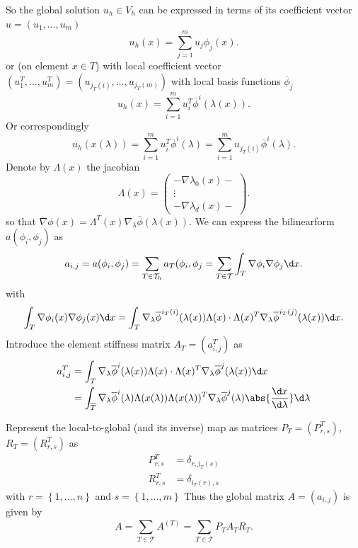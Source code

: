 So the global solution $u_{h}\in V_{h}$ can be expressed in terms of its coefficient vector $u = (u_1, \ldots , u_{m})$
\[
	u_{h}(x)=\sum_{j=1}^{m}{u_{j}\phi _{j}(x)}
.\] 
or (on element $x \in T$) with local coefficient vector $(u_1^{T}, \ldots , u_{m}^{T}) = (u_{j_{T}(i)}, \ldots , u_{j_{T}(m)})$ with local basis functions $\overline{\phi }_{j}$
\[
	u_{h}(x) = \sum_{i=1}^{m}{u_{i}^{T}\overline{\phi }^{i}(\lambda (x))}
.\] 
Or correspondingly 
\[
	u_{h}(x(\lambda )) = \sum_{i=1}^{m}{u_{i}^{T}\overline{\phi }^{i}(\lambda )}= \sum_{i=1}^{m}{u_{j_{T}(i)}\overline{\phi }^{i}(\lambda )}
.\] 
Denote by $\Lambda(x)$ the jacobian
\[
	\Lambda(x) = \begin{pmatrix}
		- \nabla \lambda_0(x) - \\
		\vdots \\
		- \nabla \lambda_{d}(x) -
	\end{pmatrix}
.\] 
so that $\nabla \phi (x) = \Lambda^{T}(x)\nabla _{\lambda }\overline{\phi }(\lambda (x))$. We can express the bilinearform $a(\phi _{i}, \phi _{j})$ as 
\[
	a_{i,j} = a(\phi _{i}, \phi _{j}) = \sum_{T \in \mathcal{T}_{h}}^{}{a_{T}(\phi _{i}, \phi _{j}} = \sum_{T \in \mathcal{T}}^{}{\int_{T}\nabla \phi _{i} \nabla \phi _{j} \d x}
.\] 
with
\[
	\int_{T}\nabla \phi _{i}(x)\nabla \phi _{j}(x) \d x = \int_{T}\nabla _{\lambda }\overline{\phi }^{i_{T}(i)}(\lambda (x)) \Lambda(x) \cdot \Lambda(x)^{T} \nabla _{\lambda }\overline{\phi }^{i_{T}(j)}(\lambda (x)) \d x
.\] 
Introduce the element stiffness matrix $A_{T} = (a_{i,j}^{T})$ as
\begin{align*}
	a_{i,j}^{T} &= \int_{T}\nabla _{\lambda }\overline{\phi }^{i}(\lambda (x)) \Lambda(x) \cdot \Lambda(x)^{T} \nabla _{\lambda }\overline{\phi }^{j}(\lambda (x)) \d x \\
				&= \int_{\overline{T}} \nabla _{\lambda }\overline{\phi }^{i}(\lambda ) \Lambda(x(\lambda )) \Lambda (x(\lambda ))^{T} \nabla _{\lambda} \overline{\phi }^{j}(\lambda ) \abs{\frac{\d x}{\d \lambda }} \d \lambda 
\end{align*}

Represent the local-to-global (and its inverse) map as matrices $P_{T}= (P_{r,s}^{T})$, $R_{T}=(R_{r,s}^{T})$ as
\begin{align*}
	P_{r,s}^{T}&= \delta_{r,j_{T}(s)} \\
	R_{r,s}^{T}&= \delta_{i_{T}(r),s}
\end{align*}
with $r = \left\{ 1, \ldots, n \right\} $ and $s = \left\{ 1, \ldots, m \right\} $
Thus the global matrix $A=(a_{i,j})$ is given by
\[
	A = \sum_{T \in \mathcal{T}}^{}{A^{(T)}} = \sum_{T \in \mathcal{T}}^{}{P_{T}A_{T}R_{T}}
.\] 

